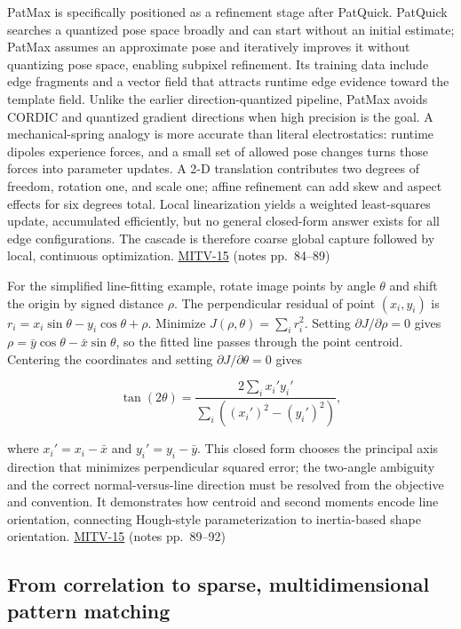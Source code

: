 PatMax is specifically positioned as a refinement stage after PatQuick. PatQuick searches a quantized pose space broadly and can start without an initial estimate; PatMax assumes an approximate pose and iteratively improves it without quantizing pose space, enabling subpixel refinement. Its training data include edge fragments and a vector field that attracts runtime edge evidence toward the template field. Unlike the earlier direction-quantized pipeline, PatMax avoids CORDIC and quantized gradient directions when high precision is the goal. A mechanical-spring analogy is more accurate than literal electrostatics: runtime dipoles experience forces, and a small set of allowed pose changes turns those forces into parameter updates. A 2-D translation contributes two degrees of freedom, rotation one, and scale one; affine refinement can add skew and aspect effects for six degrees total. Local linearization yields a weighted least-squares update, accumulated efficiently, but no general closed-form answer exists for all edge configurations. The cascade is therefore coarse global capture followed by local, continuous optimization. \hyperref[04-visual-computing-ii-ch036-mitv-15---alignment-patmax-distance-field-filtering-and-sub-sampling-us-7065262]{MITV-15} (notes pp.~84--89)

For the simplified line-fitting example, rotate image points by angle \(\theta\) and shift the origin by signed distance \(\rho\). The perpendicular residual of point \((x_i,y_i)\) is \(r_i=x_i\sin\theta-y_i\cos\theta+\rho\). Minimize \(J(\rho,\theta)=\sum_i r_i^2\). Setting \(\partial J/\partial\rho=0\) gives \(\rho=\bar{y}\cos\theta-\bar{x}\sin\theta\), so the fitted line passes through the point centroid. Centering the coordinates and setting \(\partial J/\partial\theta=0\) gives

\[
\tan(2\theta)=\frac{2\sum_i x_i'y_i'}{\sum_i((x_i')^2-(y_i')^2)},
\]

where \(x_i'=x_i-\bar{x}\) and \(y_i'=y_i-\bar{y}\). This closed form chooses the principal axis direction that minimizes perpendicular squared error; the two-angle ambiguity and the correct normal-versus-line direction must be resolved from the objective and convention. It demonstrates how centroid and second moments encode line orientation, connecting Hough-style parameterization to inertia-based shape orientation. \hyperref[04-visual-computing-ii-ch036-mitv-15---alignment-patmax-distance-field-filtering-and-sub-sampling-us-7065262]{MITV-15} (notes pp.~89--92)

\subsection{From correlation to sparse, multidimensional pattern matching}\label{04-visual-computing-ii-ch030-from-correlation-to-sparse-multidimensional-pattern-matching}

